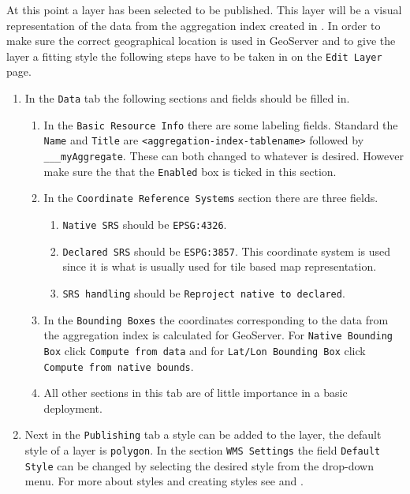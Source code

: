 \noindent At this point a layer has been selected to be published. This layer will be a visual representation of the data from the aggregation index created in . In order to make sure the correct geographical location is used in GeoServer and to give the layer a fitting style the following steps have to be taken in on the \lstinline|Edit Layer| page.

\begin{enumerate}[resume]
	\item In the \lstinline|Data| tab the following sections and fields should be filled in.
	\begin{enumerate}
		\item In the \lstinline|Basic Resource Info| there are some labeling fields. Standard the \lstinline|Name| and \lstinline|Title| are \lstinline|<aggregation-index-tablename>| followed by \lstinline|___myAggregate|. These can both changed to whatever is desired. However make sure the that the \lstinline|Enabled| box is ticked in this section.
		\item In the \lstinline|Coordinate Reference Systems| section there are three fields.
			\begin{enumerate}
				\item \lstinline|Native SRS| should be \lstinline|EPSG:4326|.
				\item \lstinline|Declared SRS| should be \lstinline|ESPG:3857|. This coordinate system is used since it is what is usually used for tile based map representation.
				\item \lstinline|SRS handling| should be \lstinline|Reproject native to declared|.
			\end{enumerate}
		\item In the \lstinline|Bounding Boxes| the coordinates corresponding to the data from the aggregation index is calculated for GeoServer. For \lstinline|Native Bounding Box| click \lstinline|Compute from data| and for \lstinline|Lat/Lon Bounding Box| click \lstinline|Compute from native bounds|.
		\item All other sections in this tab are of little importance in a basic deployment.
	\end{enumerate}
	\item Next in the \lstinline|Publishing| tab a style can be added to the layer, the default style of a layer is \lstinline|polygon|. In the section \lstinline|WMS Settings| the field \lstinline|Default| \lstinline|Style| can be changed by selecting the desired style from the drop-down menu. For more about styles and creating styles see  and .
\end{enumerate}


